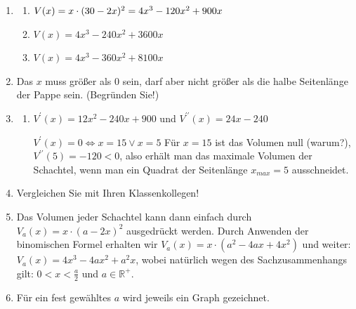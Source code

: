 \documentclass[12pt,a4paper,twoside,fleqn]{article}
\begin{document}
\begin{solution}  
  \begin{enumerate}
  \item 
    \begin{multicols}{2}
      \begin{enumerate}
      \item $V(x)=x\cdot (30-2x)^2=\\4x^3-120x^2+900x$
      \item $V(x)=4x^3 - 240x^2 +3600x$
      \item $V(x)=4x^3 - 360x^2 + 8100x$
      \end{enumerate}
    \end{multicols}
  \item Das $x$ muss größer als $0$ sein, darf aber nicht größer als
   die halbe Seitenlänge der Pappe sein. (Begründen Sie!)
  \item 
    \begin{enumerate}
   
        \item $V^\prime(x)=12x^2-240x +900$ und
        $V^{\prime\prime}(x)=24x -240$

        $V^\prime(x)=0 \Leftrightarrow x=15 \vee x=5$ Für $x=15$ ist
        das Volumen null (warum?), $V^{\prime\prime}(5)=-120 < 0$, also
        erhält man das maximale Volumen der Schachtel, wenn man ein
        Quadrat der Seitenlänge $x_{max}=5$ ausschneidet.
        \end{enumerate}
  
      \item Vergleichen Sie mit Ihren Klassenkollegen!
      \item Das Volumen jeder Schachtel kann dann einfach durch
        $V_a(x)=x\cdot (a - 2x)^2$ ausgedrückt werden.  Durch Anwenden
        der binomischen Formel erhalten wir $ V_a(x)=x\cdot(a^2 - 4ax
        + 4x^2)$ und weiter: $ V_a(x)=4x^3 - 4ax^2+ a^2x$, wobei
        natürlich wegen des Sachzusammenhangs gilt: $0 < x < \frac a
        2$ und $a\in\mathbb{R}^+$.
      \item 
        Für ein fest gewähltes $a$ wird jeweils ein Graph gezeichnet.


\end{enumerate}
\end{solution}
\end{document}
